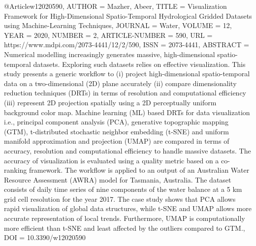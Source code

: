 
@Article{w12020590,
AUTHOR = {Mazher, Abeer},
TITLE = {Visualization Framework for High-Dimensional Spatio-Temporal Hydrological Gridded Datasets using Machine-Learning Techniques},
JOURNAL = {Water},
VOLUME = {12},
YEAR = {2020},
NUMBER = {2},
ARTICLE-NUMBER = {590},
URL = {https://www.mdpi.com/2073-4441/12/2/590},
ISSN = {2073-4441},
ABSTRACT = {Numerical modelling increasingly generates massive, high-dimensional spatio-temporal datasets. Exploring such datasets relies on effective visualization. This study presents a generic workflow to (i) project high-dimensional spatio-temporal data on a two-dimensional (2D) plane accurately (ii) compare dimensionality reduction techniques (DRTs) in terms of resolution and computational efficiency (iii) represent 2D projection spatially using a 2D perceptually uniform background color map. Machine learning (ML) based DRTs for data visualization i.e., principal component analysis (PCA), generative topographic mapping (GTM), t-distributed stochastic neighbor embedding (t-SNE) and uniform manifold approximation and projection (UMAP) are compared in terms of accuracy, resolution and computational efficiency to handle massive datasets. The accuracy of visualization is evaluated using a quality metric based on a co-ranking framework. The workflow is applied to an output of an Australian Water Resource Assessment (AWRA) model for Tasmania, Australia. The dataset consists of daily time series of nine components of the water balance at a 5 km grid cell resolution for the year 2017. The case study shows that PCA allows rapid visualization of global data structures, while t-SNE and UMAP allows more accurate representation of local trends. Furthermore, UMAP is computationally more efficient than t-SNE and least affected by the outliers compared to GTM.},
DOI = {10.3390/w12020590}
}



